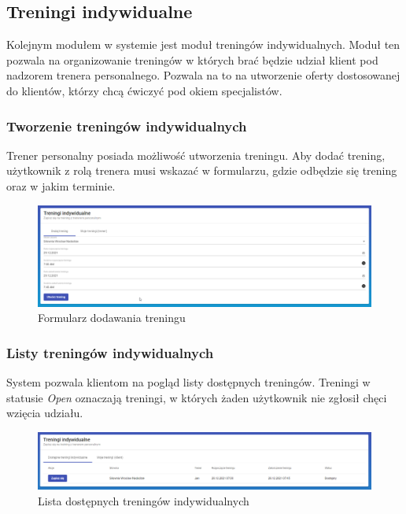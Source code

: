 \documentclass[a4paper,twoside,12pt]{book}
\begin{document}
\subsection{Treningi indywidualne}
Kolejnym modułem w systemie jest moduł treningów indywidualnych. Moduł ten pozwala na organizowanie treningów w których brać będzie udział klient pod nadzorem trenera personalnego. Pozwala na to na utworzenie oferty dostosowanej do klientów, którzy chcą ćwiczyć pod okiem specjalistów.

\subsubsection{Tworzenie treningów indywidualnych}
Trener personalny posiada możliwość utworzenia treningu. Aby dodać trening, użytkownik z rolą trenera musi wskazać w formularzu, gdzie odbędzie się trening oraz w jakim terminie.
\begin{figure}[H]
	\centering
	\includegraphics[width=1\linewidth]{../zrzuty_ekranu/dzialanie/treningi/dodawanie_treningu}
	\caption{Formularz dodawania treningu}
	\label{fig:dodawanietreningu}
\end{figure}

\subsubsection{Listy treningów indywidualnych}
System pozwala klientom na pogląd listy dostępnych treningów. Treningi w statusie \textit{Open} oznaczają treningi, w których żaden użytkownik nie zgłosił chęci wzięcia udziału.
\begin{figure}[H]
	\centering
	\includegraphics[width=1\linewidth]{../zrzuty_ekranu/dzialanie/treningi/klient_dostepne_treningi}
	\caption{Lista dostępnych treningów indywidualnych}
	\label{fig:klientdostepnetreningi}
\end{figure}
\end{document}
